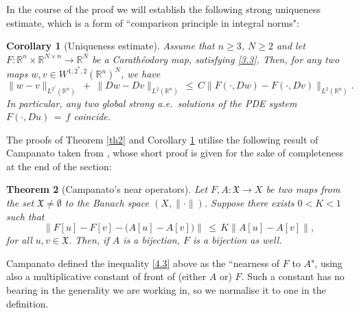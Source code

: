 \documentclass{amsart}
\newtheorem{theorem}{Theorem}
\newtheorem{corollary}[theorem]{Corollary}
\theoremstyle{definition}
\numberwithin{equation}{section}
\begin{document}
In the course of the proof we will establish the following strong uniqueness estimate, which is a form of ``comparison principle in integral norms":

\begin{corollary}[Uniqueness estimate] \label{cor1} Assume that $n\geq 3$, $N\geq 2$ and let $F : {\mathbb{R}}^n {\times} {\mathbb{R}}^{N {\times} n}{\longrightarrow} {\mathbb{R}}^N$ be a Carath\'eodory map, satisfying \eqref{3.3}. Then, for any two maps $w,v \in W^{1;2^*\!,2}({\mathbb{R}}^n)^N$, we have
\begin{equation} \label{4.2}
\|w-v\|_{L^{2^*}({\mathbb{R}}^n)}\ + \ \|Dw-Dv\|_{L^{2}({\mathbb{R}}^n)}\, \leq\, C \big\|F(\cdot,Dw)-F(\cdot,Dv) \big\|_{L^{2}({\mathbb{R}}^n)}.
\end{equation}
In particular, any two global strong a.e.\ solutions of the PDE system $F(\cdot,Du)\, =\, f$ coincide.
\end{corollary}

The proofs of Theorem \ref{th2} and Corollary \ref{cor1} utilise the following result of Campanato taken from \cite{C0}, whose short proof is given for the sake of completeness at the end of the section:

\begin{theorem}[Campanato's near operators] \label{th3}  Let $F,A : \mathfrak{X} {\longrightarrow} X$ be two maps from the set $\mathfrak{X} \neq \emptyset$ to the Banach space $(X,\|\cdot\|)$. Suppose there exists $0<K<1$ such that
\begin{equation} \label{4.3}
\Big\|F[u]-F[v]-\big( A[u]-A[v]\big) \Big\| \, \leq\, K \big\| A[u]-A[v] \big\|,
\end{equation}
for all $u,v \in \mathfrak{X}$. Then, if $A$ is a bijection, $F$ is a bijection as well.
\end{theorem}
Campanato defined the inequality \eqref{4.3}  above as the ``nearness of $F$ to $A$", using also a multiplicative constant of front of (either $A$ or) $F$. Such a constant has no bearing in the generality we are working in, so we normalise it to one in the definition.
\end{document}
